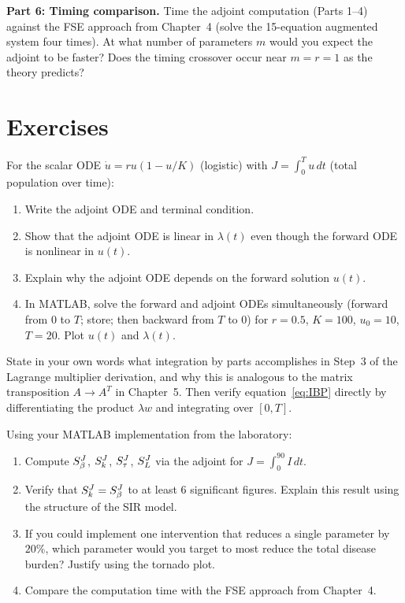 \textbf{Part 6: Timing comparison.}
Time the adjoint computation (Parts 1--4) against the FSE approach
from Chapter~4 (solve the 15-equation augmented system four times).
At what number of parameters $m$ would you expect the adjoint
to be faster? Does the timing crossover occur near $m = r = 1$
as the theory predicts?

\section{Exercises}

\begin{exercise}[\bloom{L3}]
\label{ex:ch6:scalar}
For the scalar ODE $\dot{u} = r u(1-u/K)$ (logistic) with
$J = \int_0^T u\,dt$ (total population over time):
\begin{enumerate}[label=(\alph*)]
  \item Write the adjoint ODE and terminal condition.
  \item Show that the adjoint ODE is linear in $\lambda(t)$
        even though the forward ODE is nonlinear in $u(t)$.
  \item Explain why the adjoint ODE depends on the forward solution $u(t)$.
  \item In MATLAB, solve the forward and adjoint ODEs simultaneously
        (forward from $0$ to $T$; store; then backward from $T$ to $0$)
        for $r=0.5$, $K=100$, $u_0=10$, $T=20$.
        Plot $u(t)$ and $\lambda(t)$.
\end{enumerate}
\end{exercise}

\begin{exercise}[\bloom{L3}]
\label{ex:ch6:IBP}
State in your own words what integration by parts accomplishes in
Step~3 of the Lagrange multiplier derivation, and why this is
analogous to the matrix transposition $A \to A^T$ in Chapter~5.
Then verify equation~\eqref{eq:IBP} directly by differentiating
the product $\lambda w$ and integrating over $[0,T]$.
\end{exercise}

\begin{exercise}[\bloom{L4}]
\label{ex:ch6:SIRfull}
Using your MATLAB implementation from the laboratory:
\begin{enumerate}[label=(\alph*)]
  \item Compute $S_{\beta}^{J}$, $S_{k}^{J}$, $S_{\tau}^{J}$,
        $S_{L}^{J}$ via the adjoint for $J = \int_0^{90} I\,dt$.
  \item Verify that $S_{k}^{J} = S_{\beta}^{J}$ to at least 6 significant
        figures. Explain this result using the structure of the SIR model.
  \item If you could implement one intervention that reduces a single
        parameter by $20\%$, which parameter would you target to most
        reduce the total disease burden? Justify using the tornado plot.
  \item Compare the computation time with the FSE approach from Chapter~4.
\end{enumerate}
\end{exercise}

